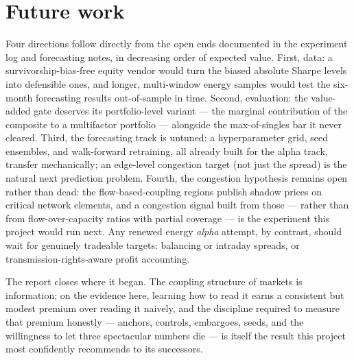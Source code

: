 \section*{Future work}

Four directions follow directly from the open ends documented in the
experiment log and forecasting notes, in decreasing order of expected
value. First, data: a survivorship-bias-free equity vendor would turn
the biased absolute Sharpe levels into defensible ones, and longer,
multi-window energy samples would test the six-month forecasting results
out-of-sample in time. Second, evaluation: the value-added gate deserves
its portfolio-level variant --- the marginal contribution of the
composite to a multifactor portfolio --- alongside the max-of-singles
bar it never cleared. Third, the forecasting track is untuned: a
hyperparameter grid, seed ensembles, and walk-forward retraining, all
already built for the alpha track, transfer mechanically; an edge-level
congestion target (not just the spread) is the natural next prediction
problem. Fourth, the congestion hypothesis remains open rather than
dead: the flow-based-coupling regions publish shadow prices on critical
network elements, and a congestion signal built from those --- rather
than from flow-over-capacity ratios with partial coverage --- is the
experiment this project would run next. Any renewed energy \emph{alpha}
attempt, by contrast, should wait for genuinely tradeable targets:
balancing or intraday spreads, or transmission-rights-aware profit
accounting.

The report closes where it began. The coupling structure of markets is
information; on the evidence here, learning how to read it earns a
consistent but modest premium over reading it naively, and the
discipline required to measure that premium honestly --- anchors,
controls, embargoes, seeds, and the willingness to let three spectacular
numbers die --- is itself the result this project most confidently
recommends to its successors.
